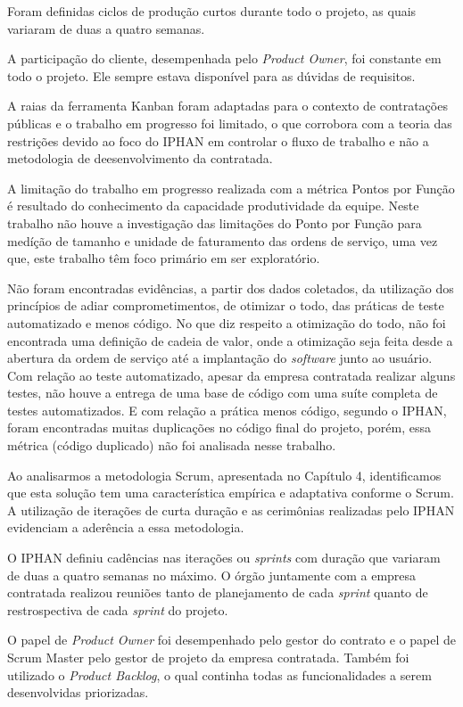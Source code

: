 Foram definidas ciclos de produção curtos durante todo o projeto, as quais variaram de duas a quatro semanas.

A participação do cliente, desempenhada pelo \textit{Product Owner}, foi constante em todo o projeto. Ele sempre estava disponível para as dúvidas de requisitos.

A raias da ferramenta Kanban foram adaptadas para o contexto de contratações públicas e o trabalho em progresso foi limitado, o que corrobora com a teoria das restrições devido ao foco do IPHAN em controlar o fluxo de trabalho e não a metodologia de deesenvolvimento da contratada.

A limitação do trabalho em progresso realizada com a métrica Pontos por Função é resultado do conhecimento da capacidade produtividade da equipe. Neste trabalho não houve a investigação das limitações do Ponto por Função para medíção de tamanho e unidade de faturamento das ordens de serviço, uma vez que, este trabalho têm foco primário em ser exploratório.  

Não foram encontradas evidências, a partir dos dados coletados, da utilização dos princípios de adiar comprometimentos, de otimizar o todo, das práticas de teste automatizado e menos código. No que diz respeito a otimização do todo, não foi encontrada uma definição de cadeia de valor, onde a otimização seja feita desde a abertura da ordem de serviço até a implantação do \textit{software} junto ao usuário. Com relação ao teste automatizado, apesar da empresa contratada realizar alguns testes, não houve a entrega de uma base de código com uma suíte completa de testes automatizados. E com relação a prática menos código, segundo o IPHAN, foram encontradas muitas duplicações no código final do projeto, porém, essa métrica (código duplicado) não foi analisada nesse trabalho.

Ao analisarmos a metodologia Scrum, apresentada no Capítulo 4, identificamos que esta solução tem uma característica empírica e adaptativa conforme o Scrum. A utilização de iterações de curta duração e as cerimônias realizadas pelo IPHAN evidenciam a aderência a essa metodologia.

O IPHAN definiu cadências nas iterações ou \textit{sprints} com duração que variaram de duas a quatro semanas no máximo. O órgão juntamente com a empresa contratada realizou reuniões tanto de planejamento de cada \textit{sprint} quanto de restrospectiva de cada \textit{sprint} do projeto. 

O papel de \textit{Product Owner} foi desempenhado pelo gestor do contrato e o papel de Scrum Master pelo gestor de projeto da empresa contratada. Também foi utilizado o \textit{Product Backlog}, o qual continha todas as funcionalidades a serem desenvolvidas priorizadas. 

